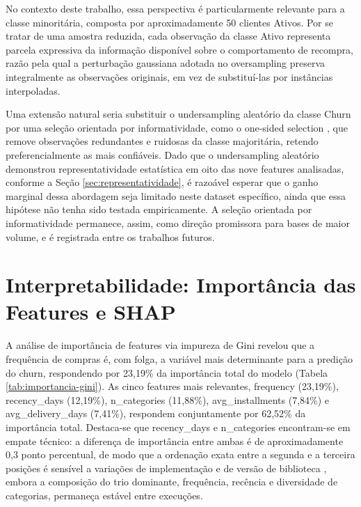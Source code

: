 No contexto deste trabalho, essa perspectiva é particularmente relevante para a classe minoritária, composta por aproximadamente 50 clientes Ativos. Por se tratar de uma amostra reduzida, cada observação da classe Ativo representa parcela expressiva da informação disponível sobre o comportamento de recompra, razão pela qual a perturbação gaussiana adotada no oversampling preserva integralmente as observações originais, em vez de substituí-las por instâncias interpoladas.

Uma extensão natural seria substituir o undersampling aleatório da classe Churn por uma seleção orientada por informatividade, como o one-sided selection \cite{kubat1997}, que remove observações redundantes e ruidosas da classe majoritária, retendo preferencialmente as mais confiáveis. Dado que o undersampling aleatório demonstrou representatividade estatística em oito das nove features analisadas, conforme a Seção \ref{sec:representatividade}, é razoável esperar que o ganho marginal dessa abordagem seja limitado neste dataset específico, ainda que essa hipótese não tenha sido testada empiricamente. A seleção orientada por informatividade permanece, assim, como direção promissora para bases de maior volume, e é registrada entre os trabalhos futuros.

\FloatBarrier
\section{Interpretabilidade: Importância das Features e SHAP} \label{sec:interpretabilidade}

A análise de importância de features via impureza de Gini \cite{breiman2001} revelou que a frequência de compras é, com folga, a variável mais determinante para a predição do churn, respondendo por 23,19\% da importância total do modelo (Tabela \ref{tab:importancia-gini}). As cinco features mais relevantes, frequency (23,19\%), recency\_days (12,19\%), n\_categories (11,88\%), avg\_installments (7,84\%) e avg\_delivery\_days (7,41\%), respondem conjuntamente por 62,52\% da importância total. Destaca-se que recency\_days e n\_categories encontram-se em empate técnico: a diferença de importância entre ambas é de aproximadamente 0,3 ponto percentual, de modo que a ordenação exata entre a segunda e a terceira posições é sensível a variações de implementação e de versão de biblioteca \cite{pedregosa2011}, embora a composição do trio dominante, frequência, recência e diversidade de categorias, permaneça estável entre execuções.

